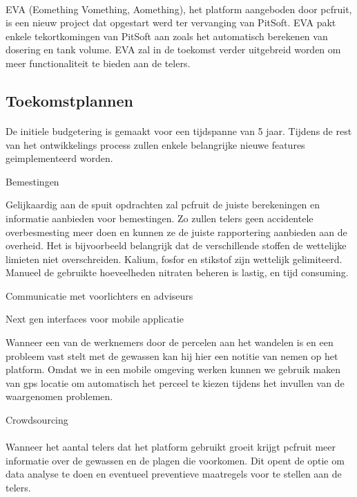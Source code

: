 \paragraph {} EVA (Eomething Vomething, Aomething), het platform aangeboden door pcfruit,
is een nieuw project dat opgestart werd ter vervanging van PitSoft. EVA pakt enkele
tekortkomingen van PitSoft aan zoals het automatisch berekenen van dosering en tank
volume. EVA zal in de toekomst verder uitgebreid worden om meer functionaliteit te bieden
aan de telers.

\subsection {Toekomstplannen}

\paragraph {} De initiele budgetering is gemaakt voor een tijdspanne van 5 jaar. Tijdens de rest van
het ontwikkelings process zullen enkele belangrijke nieuwe features geimplementeerd
worden.

Bemestingen

Gelijkaardig aan de spuit opdrachten zal pcfruit de juiste berekeningen en informatie
aanbieden voor bemestingen. Zo zullen telers geen accidentele overbesmesting meer doen en
kunnen ze de juiste rapportering aanbieden aan de overheid. Het is bijvoorbeeld
belangrijk dat de verschillende stoffen de wettelijke limieten niet overschreiden.
Kalium, fosfor en stikstof zijn wettelijk gelimiteerd. Manueel de gebruikte hoeveelheden
nitraten beheren is lastig, en tijd consuming.

Communicatie met voorlichters en adviseurs

Next gen interfaces voor mobile applicatie

Wanneer een van de werknemers door de percelen aan het wandelen is en een probleem vast
stelt met de gewassen kan hij hier een notitie van nemen op het platform. Omdat we in een
mobile omgeving werken kunnen we gebruik maken van gps locatie om automatisch het perceel
te kiezen tijdens het invullen van de waargenomen problemen.

Crowdsourcing

\paragraph {} Wanneer het aantal telers dat het platform gebruikt groeit krijgt pcfruit
meer informatie over de gewassen en de plagen die voorkomen. Dit opent de optie om data
analyse te doen en eventueel preventieve maatregels voor te stellen aan de telers.

